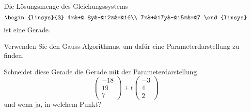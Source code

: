 Die Lösungsmenge des Gleichungssystems 
\[
\begin{linsys}{3}
4x&+& 8y&-&12z&=&16\\
7x&+&17y&-&15z&=&7
\end{linsys}
\]
ist eine Gerade.
\begin{teilaufgaben}
\item
Verwenden Sie den Gauss-Algorithmus, um dafür eine Parameterdarstellung
zu finden.
\item
Schneidet diese Gerade die Gerade mit der Parameterdarstellung
\[
\begin{pmatrix}
-18\\
 19\\
  7
\end{pmatrix}
+t
\begin{pmatrix}
-3\\
 4\\
 2
\end{pmatrix}
\]
und wenn ja, in welchem Punkt?
\end{teilaufgaben}


